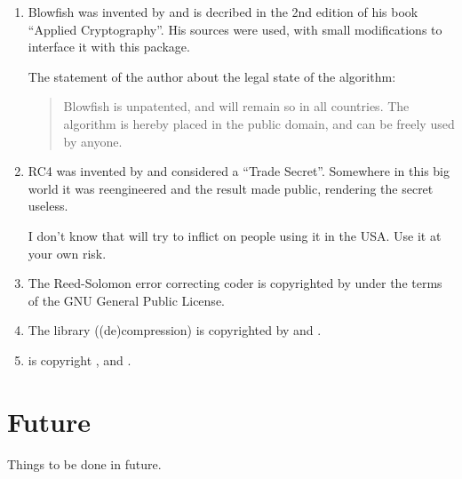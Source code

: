 \documentclass {report}
\begin{document}
\begin {enumerate}
	:
	\begin {quotation}
		The IDEA(tm) block cipher is covered by a patent held
		by ETH and a Swiss company called \ascom{}.  The
		Swiss patent number is PCT/CH91/00117.  International
		patents are pending. IDEA(tm) is a trademark of
		\ascom{}.  .  Commercial users may obtain
		licensing details from Dieter Profos, \ascom{},
		Solothurn Lab, Postfach 151, 4502 Solothurn,
		Switzerland, Tel +41 65 242885, Fax +41 65 235761. 
	\end {quotation}

\item	Blowfish was invented by \schneier{} and is decribed in the
	2nd edition of his book ``Applied Cryptography''. His sources
	were used, with small modifications to interface it with this
	package.

	The statement of the author about the legal state of the
	algorithm:

	\begin {quotation}
		Blowfish is unpatented, and will remain so in all
		countries. The algorithm is hereby placed in the
		public domain, and can be freely used by anyone.
	\end {quotation}

\item	RC4 was invented by \rsadsi{} and considered a ``Trade
	Secret''. Somewhere in this big world it was reengineered and
	the result made public, rendering the secret useless.

	I don't know that \rsadsi will try to inflict on people using
	it in the USA. Use it at your own risk.

\item	The Reed-Solomon error correcting coder is copyrighted by
	\paulf{} under the terms of the GNU General Public License.

\item	The library \zlib{} ((de)compression) is copyrighted by
	\jlgailly{} and \madler.

\item	\rmd{} is copyright \dobbertin{}, \bosselaers{} and \preneel{}.
\end   {enumerate}


\chapter {Future}

Things to be done in future.
\end{document}

